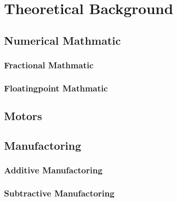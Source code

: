 \chapter{Theoretical Background}
\label{theoretical_background}

\section{Numerical Mathmatic}
\subsection{Fractional Mathmatic}
\subsection{Floatingpoint Mathmatic}

\section{Motors}

\section{Manufactoring}
\subsection{Additive Manufactoring}
\subsection{Subtractive Manufactoring}
